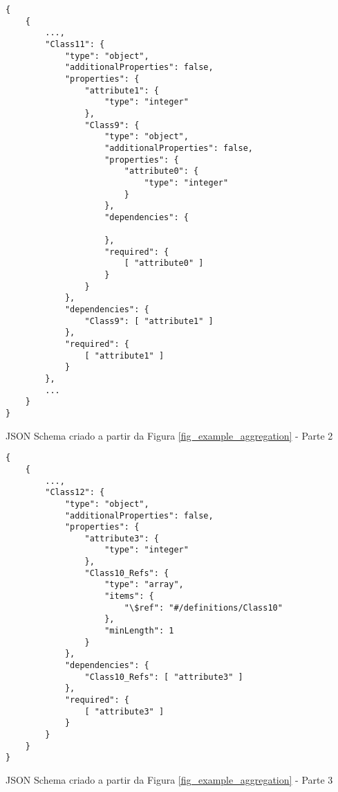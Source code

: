 \begin{anexosenv}
\begin{listing}
\begin{verbatim}
{
    {
        ...,
        "Class11": {
            "type": "object",
            "additionalProperties": false,
            "properties": {
                "attribute1": {
                    "type": "integer"
                },
                "Class9": {
                    "type": "object",
                    "additionalProperties": false,
                    "properties": {
                        "attribute0": {
                            "type": "integer"
                        }
                    },
                    "dependencies": {
                    
                    },
                    "required": {
                        [ "attribute0" ]
                    }
                }
            },
            "dependencies": {
                "Class9": [ "attribute1" ]
            },
            "required": {
                [ "attribute1" ]
            }
        },
        ...
    }
}
\end{verbatim}
\caption{JSON Schema criado a partir da Figura \ref{fig_example_aggregation} - Parte 2}
\end{listing}

\begin{listing}
\begin{verbatim}
{
    {
        ...,
        "Class12": {
            "type": "object",
            "additionalProperties": false,
            "properties": {
                "attribute3": {
                    "type": "integer"
                },
                "Class10_Refs": {
                    "type": "array",
                    "items": {
                        "\$ref": "#/definitions/Class10"
                    },
                    "minLength": 1
                }
            },
            "dependencies": {
                "Class10_Refs": [ "attribute3" ]
            },
            "required": {
                [ "attribute3" ]
            }
        }
    }
}
\end{verbatim}
\caption{JSON Schema criado a partir da Figura \ref{fig_example_aggregation} - Parte 3}
\end{listing}


\end{anexosenv}
